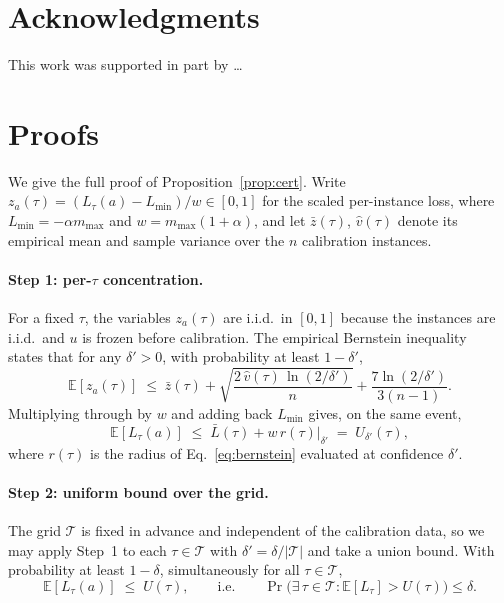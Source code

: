 \documentclass{article}
\begin{document}
\section*{Acknowledgments}
This work was supported in part by \ldots{}




\appendix

\section{Proofs}
\label{app:proofs}

We give the full proof of Proposition~\ref{prop:cert}. Write
$z_a(\tau)=(L_\tau(a)-L_{\min})/w\in[0,1]$ for the scaled per-instance
loss, where $L_{\min}=-\alpha m_{\max}$ and $w=m_{\max}(1+\alpha)$, and
let $\bar z(\tau)$, $\hat v(\tau)$ denote its empirical mean and sample
variance over the $n$ calibration instances.

\paragraph{Step 1: per-$\tau$ concentration.}
For a fixed $\tau$, the variables $z_a(\tau)$ are i.i.d.\ in $[0,1]$
because the instances are i.i.d.\ and $u$ is frozen before calibration.
The empirical Bernstein inequality~\cite{maurer2009empirical} states
that for any $\delta'>0$, with probability at least $1-\delta'$,
\[
\mathbb{E}[z_a(\tau)]
\;\le\;\bar z(\tau)
+\sqrt{\frac{2\,\hat v(\tau)\,\ln(2/\delta')}{n}}
+\frac{7\ln(2/\delta')}{3(n-1)} .
\]
Multiplying through by $w$ and adding back $L_{\min}$ gives, on the same
event,
\[
\mathbb{E}[L_\tau(a)]
\;\le\;\bar L(\tau)+w\,r(\tau)\Big|_{\delta'}
\;=\;U_{\delta'}(\tau),
\]
where $r(\tau)$ is the radius of Eq.~\eqref{eq:bernstein} evaluated at
confidence $\delta'$.

\paragraph{Step 2: uniform bound over the grid.}
The grid $\mathcal{T}$ is fixed in advance and independent of the
calibration data, so we may apply Step~1 to each $\tau\in\mathcal{T}$
with $\delta'=\delta/|\mathcal{T}|$ and take a union bound. With
probability at least $1-\delta$, simultaneously for all
$\tau\in\mathcal{T}$,
\[
\mathbb{E}[L_\tau(a)]\;\le\;U(\tau),
\qquad\text{i.e.}\qquad
\Pr\Big(\exists\,\tau\in\mathcal{T}:\mathbb{E}[L_\tau]>U(\tau)\Big)\le\delta .
\tag{$\ast$}
\]
\end{document}
